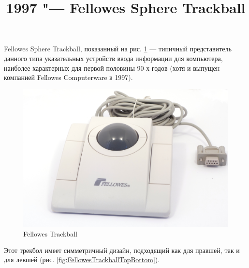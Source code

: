\documentclass[11pt, a4paper]{article}
\begin{document}
\title{1997 "--- Fellowes Sphere Trackball}
\date{}
\maketitle
{}
Fellowes Sphere Trackball, показанный на рис. \ref{fig:FellowesTrackballPic} — типичный представитель данного типа указательных устройств ввода информации для компьютера, наиболее характерных для первой половины 90-х годов (хотя и выпущен компанией Fellowes Computerware в 1997).

\begin{figure}[h]
    \centering
    \includegraphics[scale=0.5]{1997_fellowes_trackball/pic_30.jpg}
    \caption{Fellowes Trackball}
    \label{fig:FellowesTrackballPic}
\end{figure}

Этот трекбол имеет симметричный дизайн, подходящий как для правшей, так и для левшей (рис. \ref{fig:FellowesTrackballTopBottom}). 
\end{document}
